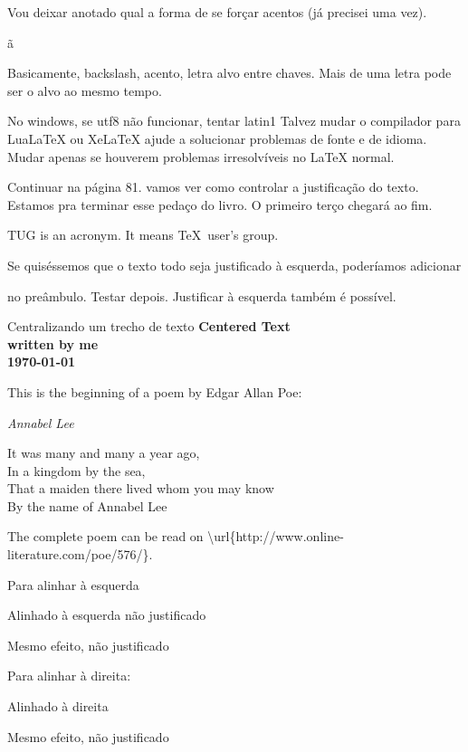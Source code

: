 \documentclass{article}
\begin{document}
Vou deixar anotado qual a forma de se forçar acentos (já precisei uma vez).

\~{a}

Basicamente, backslash, acento, letra alvo entre chaves.
Mais de uma letra pode ser o alvo ao mesmo tempo.

No windows, se utf8 não funcionar, tentar latin1
Talvez mudar o compilador para LuaLaTeX ou XeLaTeX ajude a solucionar
problemas de fonte e de idioma.
Mudar apenas se houverem problemas irresolvíveis no LaTeX normal.

Continuar na página 81. vamos ver como controlar a justificação do texto.
Estamos pra terminar esse pedaço do livro. O primeiro terço chegará ao fim.

\parbox{3cm}{\raggedright
    TUG is an acronym. It means \TeX\ user's group.
}
Se quiséssemos que o texto todo seja justificado à esquerda, poderíamos
adicionar \raggedright no preâmbulo. 
Testar depois.
Justificar à esquerda também é possível.

Centralizando um trecho de texto
{\centering
\huge\bfseries Centered Text \\
\Large \normalfont written by me \\
\normalsize \today \\
}


\noindent This is the beginning of a poem
by Edgar Allan Poe:
\begin{center}
    \emph{Annabel Lee}
\end{center}
\begin{center}
    It was many and many a year ago,\\
    In a kingdom by the sea,\\
    That a maiden there lived whom you may know\\
    By the name of Annabel Lee
\end{center}

The complete poem can be read on
\textbackslash url\{http://www.online-literature.com/poe/576/\}.

Para alinhar à esquerda
\begin{flushleft}
Alinhado à esquerda não justificado
\end{flushleft}
{\raggedright
Mesmo efeito, não justificado
}

Para alinhar à direita:
\begin{flushright}
    Alinhado à direita
\end{flushright}
{\raggedleft
Mesmo efeito, não justificado
}
\end{document}
